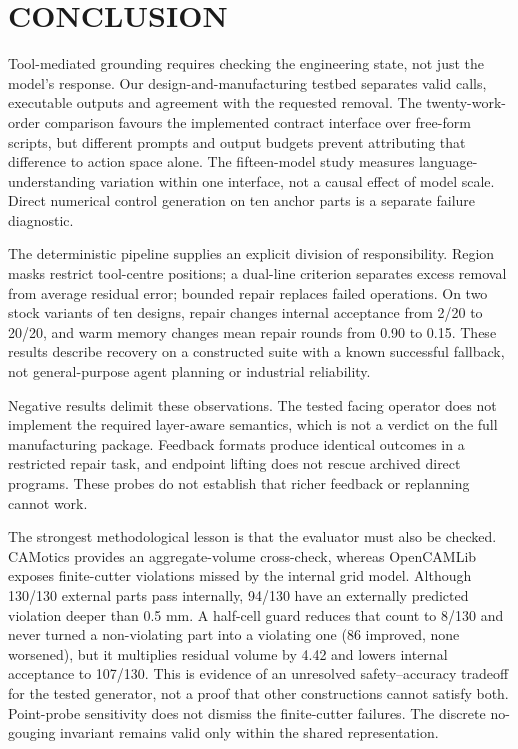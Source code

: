 \section{CONCLUSION}

Tool-mediated grounding requires checking the engineering state, not just the model's response. Our design-and-manufacturing testbed separates valid calls, executable outputs and agreement with the requested removal. The twenty-work-order comparison favours the implemented contract interface over free-form scripts, but different prompts and output budgets prevent attributing that difference to action space alone. The fifteen-model study measures language-understanding variation within one interface, not a causal effect of model scale. Direct numerical control generation on ten anchor parts is a separate failure diagnostic.

The deterministic pipeline supplies an explicit division of responsibility. Region masks restrict tool-centre positions; a dual-line criterion separates excess removal from average residual error; bounded repair replaces failed operations. On two stock variants of ten designs, repair changes internal acceptance from 2/20 to 20/20, and warm memory changes mean repair rounds from 0.90 to 0.15. These results describe recovery on a constructed suite with a known successful fallback, not general-purpose agent planning or industrial reliability.

Negative results delimit these observations. The tested facing operator does not implement the required layer-aware semantics, which is not a verdict on the full manufacturing package. Feedback formats produce identical outcomes in a restricted repair task, and endpoint lifting does not rescue archived direct programs. These probes do not establish that richer feedback or replanning cannot work.

The strongest methodological lesson is that the evaluator must also be checked. CAMotics provides an aggregate-volume cross-check, whereas OpenCAMLib exposes finite-cutter violations missed by the internal grid model. Although 130/130 external parts pass internally, 94/130 have an externally predicted violation deeper than 0.5 mm. A half-cell guard reduces that count to 8/130 and never turned a non-violating part into a violating one (86 improved, none worsened), but it multiplies residual volume by 4.42 and lowers internal acceptance to 107/130. This is evidence of an unresolved safety--accuracy tradeoff for the tested generator, not a proof that other constructions cannot satisfy both. Point-probe sensitivity does not dismiss the finite-cutter failures. The discrete no-gouging invariant remains valid only within the shared representation.

